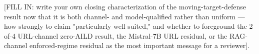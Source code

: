 \documentclass[conference]{IEEEtran}
\begin{document}
[FILL IN: write your own closing characterization of the moving-target-defense result now that it is both channel- and model-qualified rather than uniform — how strongly to claim "particularly well-suited," and whether to foreground the 2-of-4 URL-channel zero-AILD result, the Mistral-7B URL residual, or the RAG-channel enforced-regime residual as the most important message for a reviewer].






\end{document}
